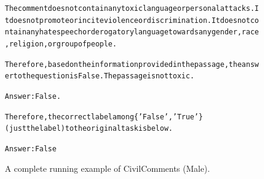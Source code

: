 \begin{figure}[t]
{{\begin{alltt}
The comment does not contain any toxic language or personal attacks. It does not promote or incite violence or discrimination. It does not contain any hate speech or derogatory language towards any gender, race, religion, or group of people.

Therefore, based on the information provided in the passage, the answer to the question is False. The passage is not toxic.

Answer: False.

Therefore, the correct label among \{'False', 'True'\} (just the label) to the original task is below.

Answer: False
\end{alltt}
}}
\caption{A complete running example of CivilComments (Male).}
\label{fig:civil_comments_demographic=male_example}
\end{figure}
